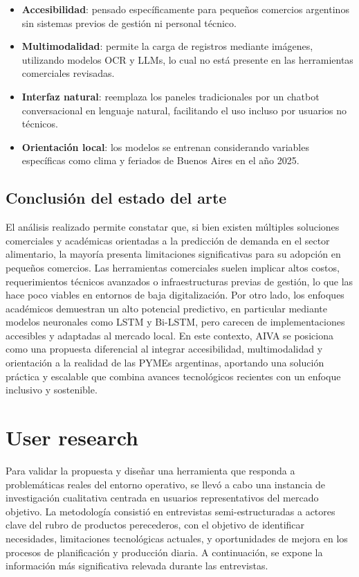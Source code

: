 \begin{itemize}
    \item \textbf{Accesibilidad}: pensado específicamente para pequeños comercios argentinos sin sistemas previos de gestión ni personal técnico.

    \item \textbf{Multimodalidad}: permite la carga de registros mediante imágenes, utilizando modelos OCR y LLMs, lo cual no está presente en las herramientas comerciales revisadas.

    \item \textbf{Interfaz natural}: reemplaza los paneles tradicionales por un chatbot conversacional en lenguaje natural, facilitando el uso incluso por usuarios no técnicos.

    \item \textbf{Orientación local}: los modelos se entrenan considerando variables específicas como clima y feriados de Buenos Aires en el año 2025.
\end{itemize}


\subsection{Conclusión del estado del arte}
El análisis realizado permite constatar que, si bien existen múltiples soluciones comerciales y académicas orientadas a la predicción de demanda en el sector alimentario, la mayoría presenta limitaciones significativas para su adopción en pequeños comercios. Las herramientas comerciales suelen implicar altos costos, requerimientos técnicos avanzados o infraestructuras previas de gestión, lo que las hace poco viables en entornos de baja digitalización. Por otro lado, los enfoques académicos demuestran un alto potencial predictivo, en particular mediante modelos neuronales como LSTM y Bi-LSTM, pero carecen de implementaciones accesibles y adaptadas al mercado local. En este contexto, AIVA se posiciona como una propuesta diferencial al integrar accesibilidad, multimodalidad y orientación a la realidad de las PYMEs argentinas, aportando una solución práctica y escalable que combina avances tecnológicos recientes con un enfoque inclusivo y sostenible.

\newpage %

\section{User research}

Para validar la propuesta y diseñar una herramienta que responda a problemáticas reales del entorno operativo, se llevó a cabo una instancia de investigación cualitativa centrada en usuarios representativos del mercado objetivo. La metodología consistió en entrevistas semi-estructuradas a actores clave del rubro de productos perecederos, con el objetivo de identificar necesidades, limitaciones tecnológicas actuales, y oportunidades de mejora en los procesos de planificación y producción diaria. A continuación, se expone la información más significativa relevada durante las entrevistas.

